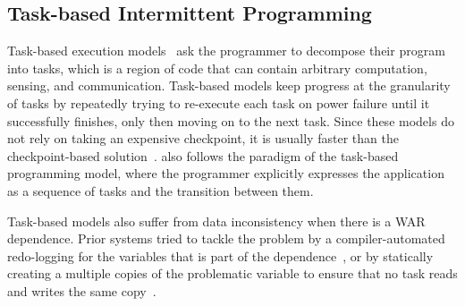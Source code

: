 \subsection{Task-based Intermittent Programming}
\label{section:background_task_computing}

Task-based execution models~\cite{dino,chain,alpaca} ask the programmer to
decompose their program into tasks, which is a region of code that can contain
arbitrary computation, sensing, and communication.  Task-based models keep
progress at the granularity of tasks by repeatedly trying to re-execute each
task on power failure until it successfully finishes, only then moving on to
the next task.  Since these models do not rely on taking an expensive
checkpoint, it is usually faster than the checkpoint-based
solution~\cite{chain, alpaca}.  \sys also follows the paradigm of the
task-based programming model, where the programmer explicitly expresses the
application as a sequence of tasks and the transition between them.

Task-based models also suffer from data inconsistency when there is a WAR
dependence.  Prior systems tried to tackle the problem by a compiler-automated
redo-logging for the variables that is part of the dependence~\cite{alpaca}, or
by statically creating a multiple copies of the problematic variable to ensure
that no task reads and writes the same copy~\cite{chain}.

